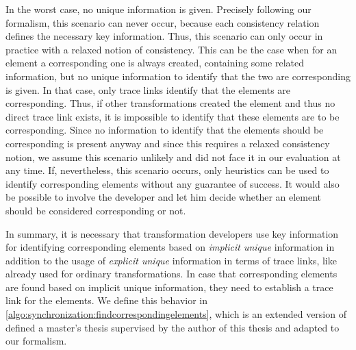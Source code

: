 In the worst case, no unique information is given.
Precisely following our formalism, this scenario can never occur, because each consistency relation defines the necessary key information.
Thus, this scenario can only occur in practice with a relaxed notion of consistency.
This can be the case when for an element a corresponding one is always created, containing some related information, but no unique information to identify that the two are corresponding is given.
In that case, only trace links identify that the elements are corresponding.
Thus, if other transformations created the element and thus no direct trace link exists, it is impossible to identify that these elements are to be corresponding.
Since no information to identify that the elements should be corresponding is present anyway and since this requires a relaxed consistency notion, we assume this scenario unlikely and did not face it in our evaluation at any time.
If, nevertheless, this scenario occurs, only heuristics can be used to identify corresponding elements without any guarantee of success.
It would also be possible to involve the developer and let him decide whether an element should be considered corresponding or not.

In summary, it is necessary that transformation developers use key information for identifying corresponding elements based on \emph{implicit unique} information in addition to the usage of \emph{explicit unique} information in terms of trace links, like already used for ordinary transformations.
In case that corresponding elements are found based on implicit unique information, they need to establish a trace link for the elements.
We define this behavior in \autoref{algo:synchronization:findcorrespondingelements}, which is an extended version of \cite[Algorithm 1]{saglam2020ma} defined a master's thesis supervised by the author of this thesis and adapted to our formalism.

